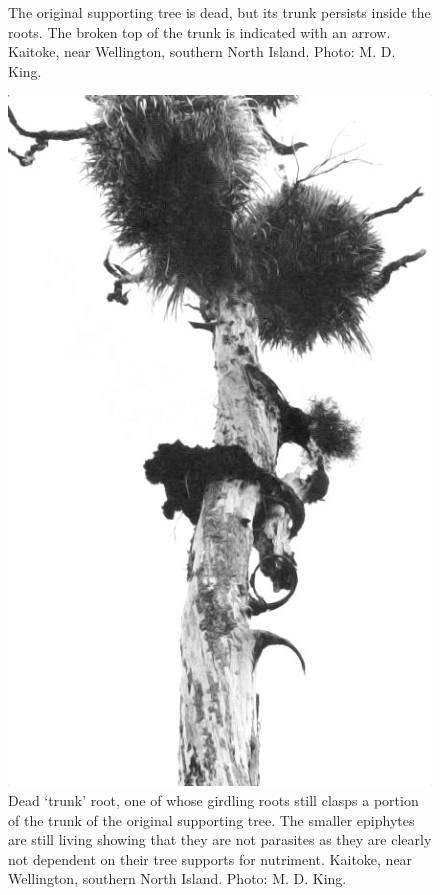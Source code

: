 \begin{figure}[t]
\begin{minipage}[t]{\textwidth}
\begin{minipage}[t]{(\textwidth-\fgap) * \real{0.536}}
{			The original supporting tree is dead, but its trunk persists inside the  roots.
			The broken top of the trunk is indicated with an arrow.
			Kaitoke, near Wellington, southern North Island.
			Photo: M. D. King.}%
			\label{fig:52rata-branched}
		\end{minipage}\hspace{\fgap}%
		\begin{minipage}[t]{(\textwidth-\fgap) * \real{0.464}}
			\centering
			\includegraphics[width=\textwidth]{graphics/fig_053}
			\caption[Dead northern rata `trunk' root]{Dead  `trunk' root, one of whose girdling roots still clasps a portion of the trunk of the original supporting tree.
			The smaller epiphytes are still living showing that they are not parasites as they are clearly not dependent on their tree supports for nutriment.
			Kaitoke, near Wellington, southern North Island.
			Photo: M. D. King.}%
			\label{fig:53dead-rata}
		\end{minipage}
	\end{minipage}
\end{figure}

